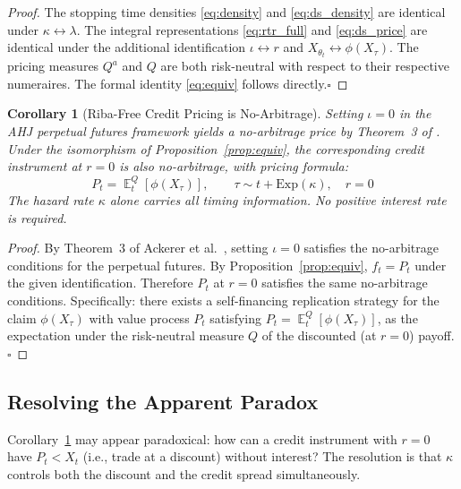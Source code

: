 \documentclass[10pt,twocolumn]{article}
\theoremstyle{plain}
\newtheorem{corollary}{Corollary}
\theoremstyle{definition}
\DeclareMathOperator{\E}{\mathbb{E}}
\newcommand{\Qa}{Q^a}
\begin{document}
\begin{proof}
The stopping time densities \eqref{eq:density} and
\eqref{eq:ds_density} are identical under $\kappa \leftrightarrow
\lambda$. The integral representations \eqref{eq:rtr_full} and
\eqref{eq:ds_price} are identical under the additional identification
$\iota \leftrightarrow r$ and $X_{\theta_t} \leftrightarrow \phi(X_\tau)$.
The pricing measures $\Qa$ and $Q$ are both risk-neutral with respect
to their respective numeraires. The formal identity \eqref{eq:equiv}
follows directly.\qquad$\square$
\end{proof}

\begin{corollary}[Riba-Free Credit Pricing is No-Arbitrage]
\label{cor:riba_free}
Setting $\iota = 0$ in the AHJ perpetual futures framework yields
a no-arbitrage price by Theorem~3 of \textup{\cite{Ackerer2024}}.
Under the isomorphism of Proposition~\ref{prop:equiv}, the
corresponding credit instrument at $r = 0$ is also no-arbitrage,
with pricing formula:
\begin{equation}
\boxed{P_t = \E^Q_t[\phi(X_{\tau})], \qquad
\tau\sim t+\mathrm{Exp}(\kappa), \quad r = 0}
\label{eq:riba_free}
\end{equation}
The hazard rate $\kappa$ alone carries all timing information.
No positive interest rate is required.
\end{corollary}

\begin{proof}
By Theorem~3 of Ackerer et al.\ \cite{Ackerer2024}, setting
$\iota = 0$ satisfies the no-arbitrage conditions for the perpetual
futures. By Proposition~\ref{prop:equiv}, $f_t = P_t$ under the
given identification. Therefore $P_t$ at $r = 0$ satisfies the
same no-arbitrage conditions.
Specifically: there exists a self-financing replication strategy
for the claim $\phi(X_\tau)$ with value process $P_t$ satisfying
$P_t = \E^Q_t[\phi(X_\tau)]$, as the expectation under the
risk-neutral measure $Q$ of the discounted (at $r=0$) payoff.
\qquad$\square$
\end{proof}

\subsection{Resolving the Apparent Paradox}

Corollary~\ref{cor:riba_free} may appear paradoxical: how can a
credit instrument with $r = 0$ have $P_t < X_t$ (i.e., trade at
a discount) without interest? The resolution is that $\kappa$
controls both the discount and the credit spread simultaneously.
\end{document}
